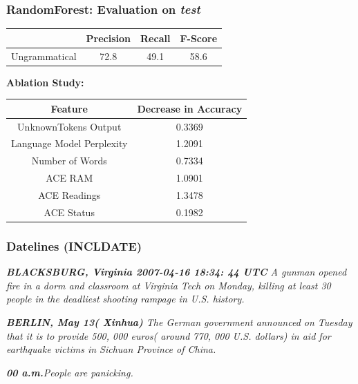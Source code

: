 \documentclass[table]{beamer}
\begin{document}
\begin{frame}
  \frametitle{\textbf{RandomForest}: Evaluation on \textit{test}}
  \quad\quad\begin{tabular}{r|c|c|c|}
  & \textbf{Precision} & \textbf{Recall} & \textbf{F-Score}\\
  \hline
  Ungrammatical & 72.8 & 49.1 & 58.6\\
  \hline
  \end{tabular}
  \vspace{0.5cm}\pause

  \quad\quad\textbf{Ablation Study:}

  \vspace{0.25cm}
  \quad\quad\begin{tabular}{c|c}
  \hline\hline
  Feature & Decrease in Accuracy\\%
  \hline
  UnknownTokens Output & 0.3369\\
  Language Model Perplexity & 1.2091\\
  Number of Words & 0.7334\\
  ACE RAM & 1.0901\\
  ACE Readings & 1.3478\\
  ACE Status & 0.1982\\
  \hline\hline
  \end{tabular}

\end{frame}


\begin{frame}
  \frametitle{Datelines (INCLDATE)}
  \textit{\textbf{BLACKSBURG, Virginia 2007-04-16 18:34: 44 UTC} A gunman opened fire in a dorm and classroom at Virginia Tech on Monday, killing at least 30 people in the deadliest shooting rampage in U.S. history.}
  \vspace{0.5cm}

  \textit{\textbf{BERLIN, May 13( Xinhua)} The German government announced on Tuesday that it is to provide 500, 000 euros( around 770, 000 U.S. dollars) in aid for earthquake victims in Sichuan Province of China.}
  \vspace{0.5cm}

  \textit{\textbf{00 a.m.}People are panicking.}
\end{frame}
\end{document}
